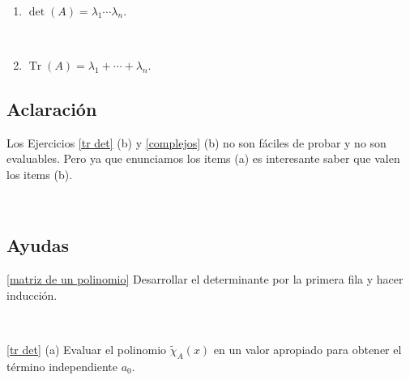 \documentclass[12pt]{amsart}
\begin{document}
\begin{enumerate}[resume]
\

\begin{enumerate}
	\item $\det(A)=\lambda_1\cdots \lambda_n$.
	
	\
	
	\item $\operatorname{Tr}(A)=\lambda_1+\cdots+\lambda_n$.
\end{enumerate}

\subsection*{Aclaraci\'on}
Los Ejercicios \eqref{tr det} (b) y \eqref{complejos} (b) no son f\'aciles de probar y no son \linebreak evaluables. Pero ya que enunciamos los items (a) es interesante saber que valen los items (b).
%
%

\end{enumerate}


\

\subsection*{Ayudas}

\eqref{matriz de un polinomio} Desarrollar el determinante por la primera fila y hacer inducci\'on.

\

\eqref{tr det} (a) Evaluar el polinomio $\tilde\chi_A(x)$ en un valor apropiado para obtener el t\'ermino independiente $a_0$.

\
\end{document}

